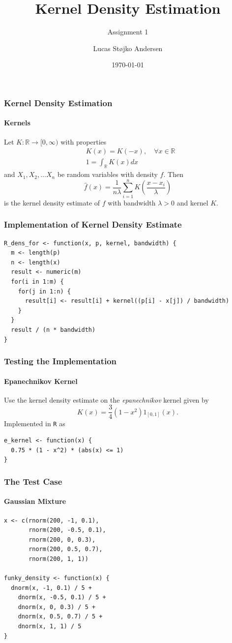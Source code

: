 \documentclass[aspectratio=169]{beamer}
\title{Kernel Density Estimation}
\subtitle{Assignment 1}
\author{Lucas Støjko Andersen}
\institute{University of Copenhagen}
\date{\today}
\begin{document}
\begin{frame}
    \titlepage
\end{frame}
\begin{frame}
    \frametitle{Kernel Density Estimation}
    \framesubtitle{Kernels}
    Let $K:\mathbb{R}\longrightarrow[0,\infty)$ with properties
    \begin{align}
      &K(x)=K(-x),\quad\forall x\in\mathbb{R}\\
      &1 = \int_{\mathbb{R}}K(x)dx
    \end{align}
    and $X_{1},X_{2},\ldots X_{n}$ be random variables with density $f$. Then 
    \begin{equation}
      \hat{f}(x)=\frac{1}{n\lambda}\sum_{i=1}^{n}K\left(\frac{x - x_{i}}{\lambda}\right)
    \end{equation}
    is the kernel density estimate of $f$ with bandwidth $\lambda > 0$ and kernel $K$.
\end{frame}
\begin{frame}[fragile]
  \frametitle{Implementation of Kernel Density Estimate}
\begin{verbatim}
R_dens_for <- function(x, p, kernel, bandwidth) {
  m <- length(p)
  n <- length(x)
  result <- numeric(m)
  for(i in 1:m) {
    for(j in 1:n) {
      result[i] <- result[i] + kernel((p[i] - x[j]) / bandwidth)
    }
  }
  result / (n * bandwidth)
}
\end{verbatim}
\end{frame}
\begin{frame}[fragile]
  \frametitle{Testing the Implementation}
  \framesubtitle{Epanechnikov Kernel}
  Use the kernel density estimate on the \textit{epanechnikov} kernel given by
  \begin{equation}
    K(x)=\frac{3}{4}(1 - x^{2})1_{[0,1]}(x).
  \end{equation}
  Implemented in \texttt{R} as\\[5pt]
\begin{verbatim}
e_kernel <- function(x) {
  0.75 * (1 - x^2) * (abs(x) <= 1)
}
\end{verbatim}
\end{frame}
\begin{frame}[fragile]
  \frametitle{The Test Case}
  \framesubtitle{Gaussian Mixture}
\begin{verbatim}
x <- c(rnorm(200, -1, 0.1), 
       rnorm(200, -0.5, 0.1),
       rnorm(200, 0, 0.3),
       rnorm(200, 0.5, 0.7),
       rnorm(200, 1, 1))

funky_density <- function(x) {
  dnorm(x, -1, 0.1) / 5 +
    dnorm(x, -0.5, 0.1) / 5 +
    dnorm(x, 0, 0.3) / 5 +
    dnorm(x, 0.5, 0.7) / 5 +
    dnorm(x, 1, 1) / 5
}
\end{verbatim}
\end{frame}
\end{document}
